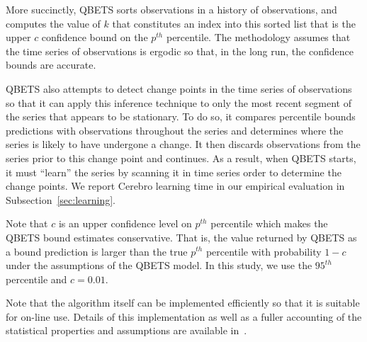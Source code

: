 More succinctly, QBETS sorts observations in a history of observations,
and computes the value of $k$ that constitutes an index into 
this sorted list that is the upper $c$ confidence bound on
the $p^{th}$ percentile. The methodology assumes that the time series of 
observations is ergodic so that, in the long run, the confidence bounds are accurate.  

QBETS also attempts to detect change points in the time series of observations 
so that it can apply this inference technique to only the most recent 
segment of the series that appears to be stationary.  
To do so, it compares
percentile bounds predictions with observations throughout the series and
determines where the series is likely to have undergone a change.  It then
discards observations from the series prior to this change point and
continues.  As a result, when QBETS starts, it must ``learn'' the series by
scanning it in time series order to determine the change points.  We report
Cerebro learning time in our empirical evaluation in
Subsection~\ref{sec:learning}.


Note that $c$ is an upper confidence level on $p^{th}$ percentile
which makes the QBETS
bound estimates conservative.  That is, the value returned by QBETS as a bound
prediction is larger than the true $p^{th}$ percentile with probability $1-c$
under the assumptions of the QBETS model. 
In this study, we use the $95^{th}$ percentile and $c = 0.01$.

Note that the algorithm itself can be implemented efficiently so that it is
suitable for on-line use.  Details of this implementation as well as a fuller
accounting of the statistical properties and assumptions are available
in~\cite{Nurmi:2007:QQB:1791551.1791556,uptime-bootstrap,quant-est,ckpt-sched}.



